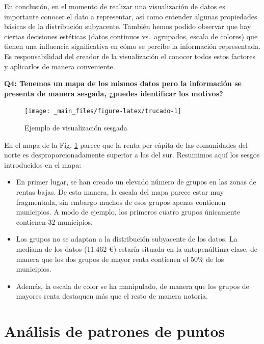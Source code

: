 \documentclass[
]{report}
\theoremstyle{definition}
\theoremstyle{definition}
\theoremstyle{definition}
\theoremstyle{definition}
\theoremstyle{remark}
\begin{document}
En conclusión, en el momento de realizar una visualización de datos es
importante conocer el dato a representar, así como entender algunas propiedades
básicas de la distribución subyacente. También hemos podido observar que hay
ciertas decisiones estéticas (datos continuos vs.~agrupados, escala de colores)
que tienen una influencia significativa en cómo se percibe la información
representada. Es responsabilidad del creador de la visualización el conocer
todos estos factores y aplicarlos de manera conveniente.

\textbf{Q4: Tenemos un mapa de los mismos datos pero la información se presenta de
manera sesgada, ¿puedes identificar los motivos?}

\begin{figure}

{\centering \texttt{[image: \_main\_files/figure-latex/trucado-1]} 

}

\caption{Ejemplo de visualización sesgada}\label{fig:trucado}
\end{figure}

En el mapa de la Fig. \ref{fig:trucado} parece que la renta per cápita de las
comunidades del norte es desproporcionadamente superior a las del sur. Resumimos
aquí los sesgos introducidos en el mapa:

\begin{itemize}
\item
  En primer lugar, se han creado un elevado número de grupos en las zonas de
  rentas bajas. De esta manera, la escala del mapa parece estar muy
  fragmentada, sin embargo muchos de esos grupos apenas contienen municipios.
  A modo de ejemplo, los primeros cuatro grupos únicamente contienen 32
  municipios.
\item
  Los grupos no se adaptan a la distribución subyacente de los datos. La
  mediana de los datos (11.462 €) estaría situada en la antepenúltima clase,
  de manera que los dos grupos de mayor renta contienen el 50\% de los
  municipios.
\item
  Además, la escala de color se ha manipulado, de manera que los grupos de
  mayores renta destaquen más que el resto de manera notoria.
\end{itemize}

\hypertarget{anuxe1lisis-de-patrones-de-puntos}{%
\section{Análisis de patrones de puntos}\label{anuxe1lisis-de-patrones-de-puntos}}
\end{document}

